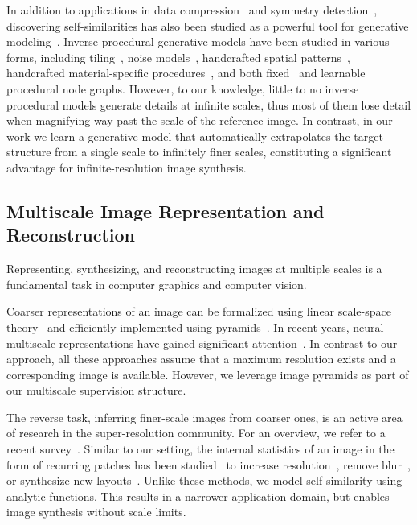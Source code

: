 In addition to applications in data compression~\cite{jacquinimage1992,barnsley1993fractal, fisher1994fractal} and symmetry detection~\cite{liu2010computational,lukavc2017nautilus}, discovering self-similarities has also been studied as a powerful tool for generative modeling~\cite{poli2022self,karnewar3ingan2022,zhang2023rose,merrell2023example}.
Inverse procedural generative models have been studied in various forms, including tiling~\cite{vanhoey2013fly}, noise models~\cite{gilet2014local,heitz2018high}, handcrafted spatial patterns~\cite{LP-gi2000}, handcrafted material-specific procedures~\cite{guo2020bayesian}, and both fixed~\cite{hu2019novel,shi2020match} and learnable~\cite{hu2022inverse} procedural node graphs. However, to our knowledge, little to no inverse procedural models generate details at infinite scales, thus most of them lose detail when magnifying way past the scale of the reference image.
In contrast, in our work we learn a generative model that automatically extrapolates the target structure from a single scale to infinitely finer scales, constituting a significant advantage for infinite-resolution image synthesis.


\subsection{Multiscale Image Representation and Reconstruction}
\label{sec:multiscale}

Representing, synthesizing, and reconstructing images at multiple scales is a fundamental task in computer graphics and computer vision. 

Coarser representations of an image can be formalized using linear scale-space theory~\cite{iijima1959basic, witkin1987scale} and efficiently implemented using pyramids~\cite{burt1981fast, williams1983pyramidal}. 
In recent years, neural multiscale representations have gained significant attention~\cite{fathony2020multiplicative, chen2021learning, paz2022multiresolution, lindell2022bacon, saragadam2022miner, mueller2022instant, Belhe2023Discontinuity, mujkanovic2024ngssf}.
In contrast to our approach, all these approaches assume that a maximum resolution exists and a corresponding image is available.
However, we leverage image pyramids as part of our multiscale supervision structure.

The reverse task, inferring finer-scale images from coarser ones, is an active area of research in the super-resolution community.
For an overview, we refer to a recent survey~\cite{superresSurvey2023}.
Similar to our setting, the internal statistics of an image in the form of recurring patches has been studied~\cite{shechtman2007matching,zontak2011internal} to increase resolution~\cite{glasner2009super,ZSSR2018,bell2019blind}, remove blur~\cite{michaeli2014blind}, or synthesize new layouts~\cite{shaham2019singan,shocher2019ingan,zhou2018non}.
Unlike these methods, we model self-similarity using analytic functions.
This results in a narrower application domain, but enables image synthesis without scale limits.

